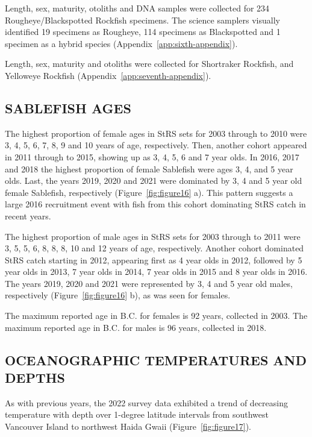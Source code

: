 \documentclass[12pt]{article}\usepackage[]{graphicx}\usepackage[]{color}
\begin{document}
Length, sex, maturity, otoliths and DNA samples were collected for 234 Rougheye/Blackspotted Rockfish specimens. The science samplers visually identified 19 specimens as Rougheye, 114 specimens as Blackspotted and 1 specimen as a hybrid species (Appendix~\ref{app:sixth-appendix}).

Length, sex, maturity and otoliths were collected for Shortraker Rockfish, and Yelloweye Rockfish (Appendix~\ref{app:seventh-appendix}).

\hypertarget{sablefish-ages}{%
\subsection{SABLEFISH AGES}\label{sablefish-ages}}

The highest proportion of female ages in StRS sets for 2003 through to 2010 were 3, 4, 5, 6, 7, 8, 9 and 10 years of age, respectively. Then, another cohort appeared in 2011 through to 2015, showing up as 3, 4, 5, 6 and 7 year olds. In 2016, 2017 and 2018 the highest proportion of female Sablefish were ages 3, 4, and 5 year olds. Last, the years 2019, 2020 and 2021 were dominated by 3, 4 and 5 year old female Sablefish, respectively (Figure~\ref{fig:figure16} a). This pattern suggests a large 2016 recruitment event with fish from this cohort dominating StRS catch in recent years.

The highest proportion of male ages in StRS sets for 2003 through to 2011 were 3, 5, 5, 6, 8, 8, 8, 10 and 12 years of age, respectively. Another cohort dominated StRS catch starting in 2012, appearing first as 4 year olds in 2012, followed by 5 year olds in 2013, 7 year olds in 2014, 7 year olds in 2015 and 8 year olds in 2016. The years 2019, 2020 and 2021 were represented by 3, 4 and 5 year old males, respectively (Figure~\ref{fig:figure16} b), as was seen for females.

The maximum reported age in B.C. for females is 92 years, collected in 2003. The maximum reported age in B.C. for males is 96 years, collected in 2018.

\hypertarget{oceanographic-temperatures-and-depths}{%
\subsection{OCEANOGRAPHIC TEMPERATURES AND DEPTHS}\label{oceanographic-temperatures-and-depths}}

As with previous years, the 2022 survey data exhibited a trend of decreasing temperature with depth over 1-degree latitude intervals from southwest Vancouver Island to northwest Haida Gwaii (Figure~\ref{fig:figure17}).
\end{document}
